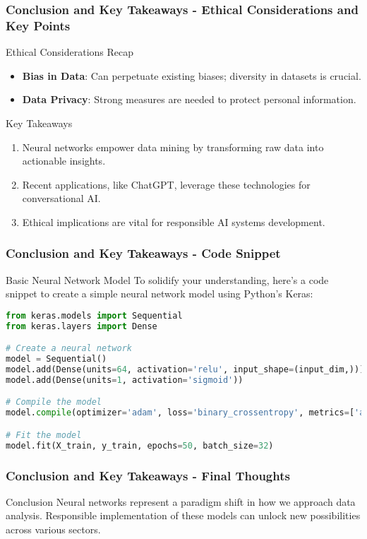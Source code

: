\documentclass[aspectratio=169]{beamer}
\begin{document}
\begin{frame}[fragile]
    \frametitle{Conclusion and Key Takeaways - Ethical Considerations and Key Points}
    \begin{block}{Ethical Considerations Recap}
        \begin{itemize}
            \item \textbf{Bias in Data}: Can perpetuate existing biases; diversity in datasets is crucial.
            \item \textbf{Data Privacy}: Strong measures are needed to protect personal information.
        \end{itemize}
    \end{block}
    
    \begin{block}{Key Takeaways}
        \begin{enumerate}
            \item Neural networks empower data mining by transforming raw data into actionable insights.
            \item Recent applications, like ChatGPT, leverage these technologies for conversational AI.
            \item Ethical implications are vital for responsible AI systems development.
        \end{enumerate}
    \end{block}
\end{frame}

\begin{frame}[fragile]
    \frametitle{Conclusion and Key Takeaways - Code Snippet}
    \begin{block}{Basic Neural Network Model}
        To solidify your understanding, here's a code snippet to create a simple neural network model using Python's Keras:
        \begin{lstlisting}[language=Python]
from keras.models import Sequential
from keras.layers import Dense

# Create a neural network
model = Sequential()
model.add(Dense(units=64, activation='relu', input_shape=(input_dim,)))
model.add(Dense(units=1, activation='sigmoid'))

# Compile the model
model.compile(optimizer='adam', loss='binary_crossentropy', metrics=['accuracy'])

# Fit the model
model.fit(X_train, y_train, epochs=50, batch_size=32)
        \end{lstlisting}
    \end{block}
\end{frame}

\begin{frame}[fragile]
    \frametitle{Conclusion and Key Takeaways - Final Thoughts}
    \begin{block}{Conclusion}
        Neural networks represent a paradigm shift in how we approach data analysis. Responsible implementation of these models can unlock new possibilities across various sectors.
    \end{block}
\end{frame}
\end{document}
